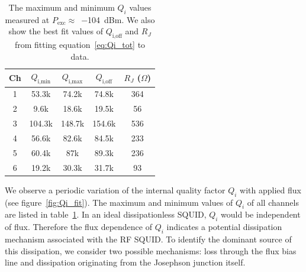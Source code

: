 \documentclass[
 prd,
 reprint,
 superscriptaddress,
 amsmath,amssymb,
 aps,
 floatfix,
]{revtex4-2}
\begin{document}
\begin{table}[htb]
    \centering
    \begin{tabular}{c c c c c}
    \hline
         Ch & $Q_{\text{i,min}}$ & $Q_{\text{i,max}}$ & $Q_{\text{i,off}}$ & $R_J$ ($\Omega$) \\
    \hline
    1 & 53.3k & 74.2k & 74.8k & 364 \\
    2 & 9.6k & 18.6k & 19.5k & 56 \\
    3 & 104.3k & 148.7k & 154.6k & 536 \\
    4 & 56.6k & 82.6k & 84.5k & 233 \\
    5 & 60.4k & 87k & 89.3k & 236 \\
    6 & 19.2k & 30.3k & 31.7k & 93 \\
    \hline
    \end{tabular}
    \caption{The maximum and minimum $Q_i$ values measured at \mbox{$P_{\text{exc}}\approx$~\qty{-104}{dBm}}. We also show the best fit values of $Q_{\text{i,off}}$ and $R_J$ from fitting equation~\eqref{eq:Qi_tot} to data.}
    \label{tab:R_sg_fits}
\end{table}

We observe a periodic variation of the internal quality factor $Q_i$ with applied flux (see figure~\ref{fig:Qi_fit}). The maximum and minimum values of $Q_i$ of all channels are listed in table~\ref{tab:R_sg_fits}. In an ideal dissipationless SQUID, $Q_i$ would be independent of flux. Therefore the flux dependence of $Q_i$ indicates a potential dissipation mechanism associated with the RF SQUID. To identify the dominant source of this dissipation, we consider two possible mechanisms: loss through the flux bias line and dissipation originating from the Josephson junction itself.
\end{document}
